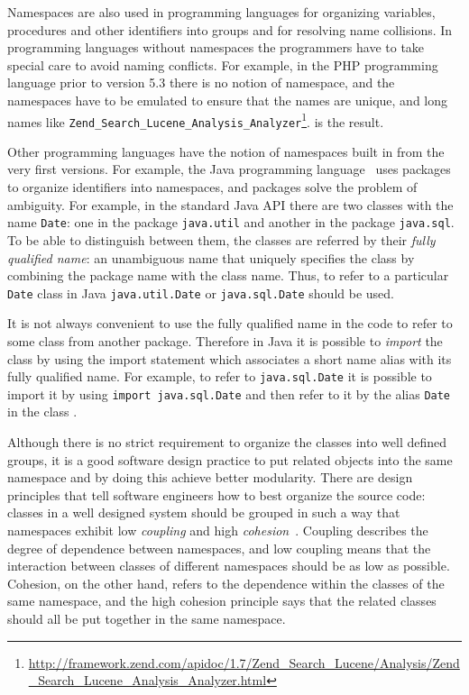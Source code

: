 Namespaces are also used in programming languages for organizing
variables, procedures and other identifiers into groups and
for resolving name collisions. In programming languages without
namespaces the programmers have to take special care to avoid
naming conflicts. For example, in the PHP programming language
prior to version 5.3 \cite{mcarthur2008php6} there is no notion of namespace, and
the namespaces have to be emulated to ensure that the names
are unique, and long names like
\verb|Zend_Search_Lucene_Analysis_Analyzer|\footnote{\url{http://framework.zend.com/apidoc/1.7/Zend_Search_Lucene/Analysis/Zend_Search_Lucene_Analysis_Analyzer.html}}.
is the result.

Other programming languages have the notion of namespaces built in
from the very first versions. For example, the Java programming
language~\cite{gosling2014java} uses packages to organize identifiers into
namespaces, and packages solve the problem of ambiguity. For example,
in the standard Java API there are two classes with the name \texttt{Date}:
one in the package \texttt{java.util} and another in the package \texttt{java.sql}.
To be able to distinguish between them, the classes are referred by their
\emph{fully qualified name}: an unambiguous name that uniquely specifies the class
by combining the package name with the class name. Thus, to refer to a particular
\texttt{Date} class in Java  \texttt{java.util.Date} or  \texttt{java.sql.Date}
should be used.

It is not always convenient to use the fully qualified name in the code to
refer to some class from another package. Therefore in Java it is possible to
\emph{import} the class by using the import statement which associates
a short name alias with its fully qualified name.
For example, to refer to \texttt{java.sql.Date} it is possible to import
it by using \texttt{import java.sql.Date} and then refer to it by the alias
\texttt{Date} in the class \cite{gosling2014java}.


Although there is no strict requirement to organize the classes into
well defined groups, it is a good software design practice to put
related objects into the same namespace and by doing this achieve
better modularity. There are design principles that tell software engineers
how to best organize the source code: classes in a well designed system
should be grouped in such a way that namespaces
exhibit low \emph{coupling} and high \emph{cohesion}~\cite{larman2005applying}.
Coupling describes the degree of dependence between namespaces, and
low coupling means that the interaction between classes of different
namespaces should be as low as possible. Cohesion, on the other hand,
refers to the dependence within the classes of the same namespace,
and the high cohesion principle says that the related classes
should all be put together in the same namespace.

